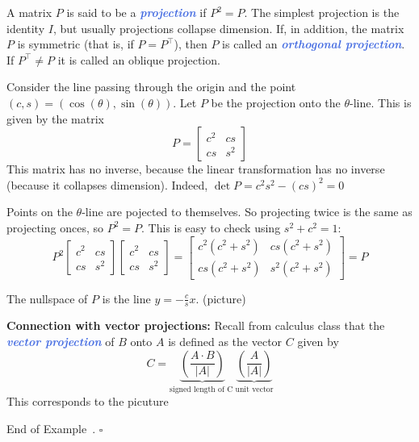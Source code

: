 \documentclass[10pt]{article}
\newcommand{\demph}[1]{\textcolor{RoyalBlue}{\textbf{\slshape #1}}} %
\theoremstyle{definition}
\newtheorem{example}[theorem]{Example}
\renewenvironment{example}
{\begin{oldexample}}
  {\par\smallskip\hfill   End of Example~\theexample. $\square$    \par\end{oldexample}}
\begin{document}
A matrix $P$ is said to be a \demph{projection} if $P^{2}=P$. The simplest
projection is the identity $I$, but usually projections collapse dimension.
If, in addition, the matrix $P$ is symmetric (that is, if $P=P^{\top}$), then
$P$ is called an \demph{orthogonal projection}. If $P^{\top}\neq P$ it is
called an \demph{}oblique projection.


\begin{example}[Projections]
  Consider the line passing through the origin and the point
  $(c,s)=(\cos(\theta),\sin(\theta))$. Let $P$ be the projection onto the
  $\theta$-line. This is given by the matrix
  \begin{equation*}
    P =
    \begin{bmatrix}
      c^{2}&cs\\cs&s^{2}
    \end{bmatrix}
  \end{equation*}
  This matrix has no inverse, because the linear transformation has no inverse
  (because it collapses dimension). Indeed, $\det P = c^{2}s^{2}- (cs)^{2}=0$

  Points on the $\theta$-line are pojected to themselves. So projecting twice
  is the same as projecting onces, so $P^{2}=P$. This is easy to check using
  $s^{2}+c^{2}=1$:
  \begin{equation*}
    P^{2}
    \begin{bmatrix}
      c^{2}&cs\\
      cs&s^{2}
    \end{bmatrix}
    \begin{bmatrix}
      c^{2}&cs\\
      cs&s^{2}
    \end{bmatrix}
    =
    \begin{bmatrix}
      c^{2}(c^{2}+s^{2})& cs(c^{2}+s^{2})\\
      cs(c^{2}+s^{2})& s^{2}(c^{2}+s^{2})
    \end{bmatrix}
    = P
  \end{equation*}

  The nullspace of $P$ is the line $y=-\frac{c}{s}x$. (picture)


  \textbf{Connection with vector projections:} Recall from calculus class that
  the \demph{vector projection} of $B$ onto $A$ is defined as the vector $C$
  given by
  \begin{equation}\label{eq:vector-projection-formula}
    C 
    = \underbrace{\left( \frac{A\cdot B}{|A|} \right)}_{\text{signed length of C\ }}
    \underbrace{\left( \frac{A}{|A|} \right)  }_{\text{unit vector}}
  \end{equation}
  This corresponds to the picuture
  

\end{example}
\end{document}
